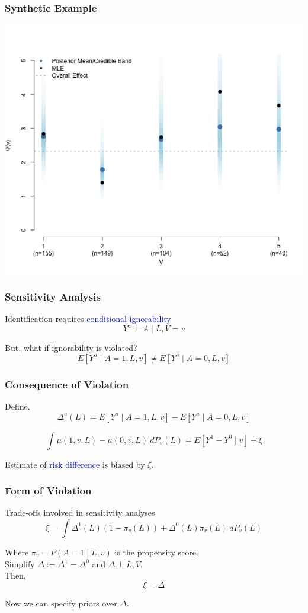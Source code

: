 \documentclass[xcolor=x11names,compress]{beamer}
\renewcommand{\(}{\begin{columns}}
\renewcommand{\)}{\end{columns}}
\newcommand{\<}[1]{\begin{column}{#1}}
\renewcommand{\>}{\end{column}}
\begin{document}
\begin{frame}
	\frametitle{Synthetic Example}
	\centerline{\includegraphics[scale=.4]{code/ppooling_plot.png}}
\end{frame}


\begin{frame}
	\frametitle{Sensitivity Analysis}
	
	Identification requires \textcolor{blue}{conditional ignorability}
	$$ Y^a \perp A \mid L, V=v $$

	But, what if ignorability is violated?
	$$ E[Y^a \mid A=1, L, v] \neq E[Y^a \mid A=0, L, v]  $$
\end{frame}

\begin{frame}
	\frametitle{Consequence of Violation}
	
	Define, 	
	$$\Delta^a(L)  = E[Y^a \mid A=1, L, v] - E[Y^a \mid A=0, L, v] $$
	
	\pause
	$$\int \mu(1,v, L) - \mu(0, v, L) \ dP_v(L)  = E[Y^1 - Y^0 \mid v ] + \xi$$
	
	Estimate of \textcolor{blue}{risk difference} is biased by $\xi$.
		
\end{frame}


\begin{frame}
	\frametitle{Form of Violation}
	Trade-offs involved in sensitivity analyses
	$$ \xi = \int \Delta^1(L)(1- \pi_v(L)) + \Delta^0(L) \pi_v(L)  \ dP_v(L) $$
	
	Where $\pi_v = P(A=1\mid L, v)$ is the propensity score. \\
	\pause
	Simplify $ \Delta := \Delta^1 = \Delta^0$ and $ \Delta \perp L,V$. \\
	\pause
	Then, 
	$$ \xi = \Delta $$
	
	Now we can specify priors over $\Delta$.
\end{frame}
\end{document}
